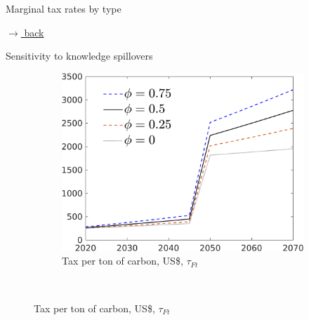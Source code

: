 \documentclass[11pt,aspectratio=169]{beamer}
\begin{document}
\begin{frame}{Marginal tax rates by type}
\begin{figure}[h!!]
		\end{figure}
		
		\vspace{-4mm}
		\hfill
		\hyperlink{backOPT}{\tiny{$\rightarrow$ back}}

	\end{frame}
			
		\begin{frame}{Sensitivity to knowledge spillovers}
			\hypertarget{sensphi}{}
			\vspace{-3mm}
			\begin{figure}[h!!]
				
				\begin{subfigure}{0.45\textwidth}		
					\caption{Tax per ton of carbon,  US\$, $\tau_{Ft}$ }
					\includegraphics[width=1\textwidth]{../codding_model/own_basedOnFried/optimalPol_010922_revision/figures/all_13Sept22/Phi_SensN_Tauf_spillover0_knspil0_xgr0_nsk0_sep0_extern0_PV1_etaa0.79_lgd1.png}
				\end{subfigure}	
				\begin{minipage}[]{0.05\textwidth}
					\ 
				\end{minipage}

\end{figure}
\end{frame}
\end{document}
